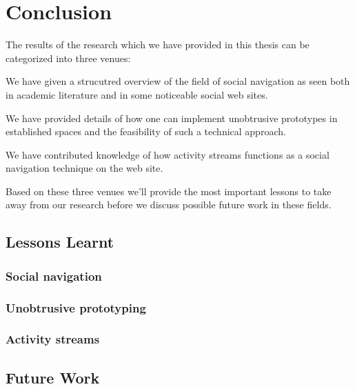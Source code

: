 \chapter{Conclusion}
\label{chapter:conclusion}

The results of the research which we have provided in this thesis can be
categorized into three venues:

\begin{enum}
  \item We have given a strucutred overview of the field of social navigation
    as seen both in academic literature and in some noticeable social web
    sites.
  \item We have provided details of how one can implement unobtrusive
    prototypes in established spaces and the feasibility of such a technical
    approach.
  \item We have contributed knowledge of how activity streams functions as
    a social navigation technique on the \urort{} web site.
\end{enum}

Based on these three venues we'll provide the most important lessons to take
away from our research before we discuss possible future work in these fields.

\section{Lessons Learnt}

\subsection{Social navigation}

\subsection{Unobtrusive prototyping}

\subsection{Activity streams}

\section{Future Work}


